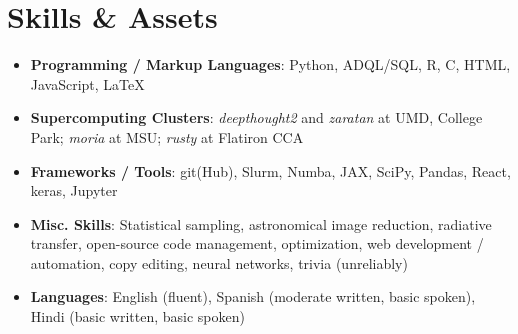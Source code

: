\documentclass[letterpaper,12pt]{article}
\newcommand{\resumeItem}[2]{
  \item\small{
    \textbf{#1}{#2 \vspace{-2pt}}
  }
}
\newcommand{\resumeSubHeadingListStart}{\begin{itemize}[leftmargin=*]}
\newcommand{\resumeSubHeadingListEnd}{\end{itemize}}
\newcommand{\resumeItemListStart}{\begin{itemize}}
\newcommand{\resumeItemListEnd}{\end{itemize}\vspace{-5pt}}
\newcommand{\shorterSection}[1]{\vspace{-10pt}\section{#1}}
\begin{document}
\vspace{-12pt}


\shorterSection{Skills \& Assets}
  \resumeSubHeadingListStart
  \small
    \item{
     \textbf{Programming / Markup Languages}{: Python, ADQL/SQL, R, C, HTML, JavaScript, \LaTeX}
    }
    \vspace{-5pt}
    \item{
     \textbf{Supercomputing Clusters}{: \textit{deepthought2} and \textit{zaratan} at UMD, College Park; \textit{moria} at MSU; \textit{rusty} at Flatiron CCA}
    }
    \vspace{-5pt}
    \item{
     \textbf{Frameworks / Tools}{: git(Hub), Slurm, Numba, JAX, SciPy, Pandas, React, keras, Jupyter}
    }
    \vspace{-5pt}
    \item{
     \textbf{Misc. Skills}{: Statistical sampling, astronomical image reduction, radiative transfer, open-source code management, optimization, web development / automation, copy editing, neural networks, trivia (unreliably)}
    }
    \vspace{-5pt}
    \item{
     \textbf{Languages}{: English (fluent), Spanish (moderate written, basic spoken), Hindi (basic written, basic spoken)}
    }
\resumeSubHeadingListEnd
\end{document}
